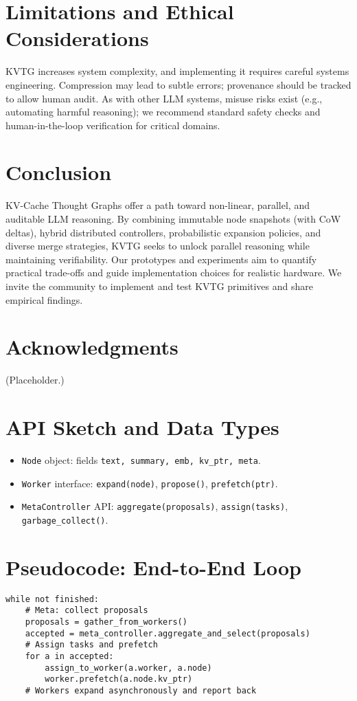 \documentclass[11pt,onecolumn,letterpaper]{article}
\begin{document}
\section{Limitations and Ethical Considerations}
KVTG increases system complexity, and implementing it requires careful systems engineering. Compression may lead to subtle errors; provenance should be tracked to allow human audit. As with other LLM systems, misuse risks exist (e.g., automating harmful reasoning); we recommend standard safety checks and human-in-the-loop verification for critical domains.

\section{Conclusion}
KV-Cache Thought Graphs offer a path toward non-linear, parallel, and auditable LLM reasoning. By combining immutable node snapshots (with CoW deltas), hybrid distributed controllers, probabilistic expansion policies, and diverse merge strategies, KVTG seeks to unlock parallel reasoning while maintaining verifiability. Our prototypes and experiments aim to quantify practical trade-offs and guide implementation choices for realistic hardware. We invite the community to implement and test KVTG primitives and share empirical findings.

\section*{Acknowledgments}
(Placeholder.)

\appendix
\section{API Sketch and Data Types}
\begin{itemize}[nosep]
  \item \texttt{Node} object: fields \texttt{text, summary, emb, kv\_ptr, meta}.
  \item \texttt{Worker} interface: \texttt{expand(node)}, \texttt{propose()}, \texttt{prefetch(ptr)}.
  \item \texttt{MetaController} API: \texttt{aggregate(proposals)}, \texttt{assign(tasks)}, \texttt{garbage\_collect()}.
\end{itemize}

\section{Pseudocode: End-to-End Loop}
\begin{verbatim}
while not finished:
    # Meta: collect proposals
    proposals = gather_from_workers()
    accepted = meta_controller.aggregate_and_select(proposals)
    # Assign tasks and prefetch
    for a in accepted:
        assign_to_worker(a.worker, a.node)
        worker.prefetch(a.node.kv_ptr)
    # Workers expand asynchronously and report back
\end{verbatim}
\end{document}
